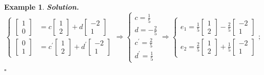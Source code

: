 \documentclass[12pt, a4paper]{article}
\newtheorem{eg}{Example}[subsection]
\newenvironment*{sol}{\par\indent\textbf{\textit{Solution. }}}{\hfill{$\square$}\par}
\def\d{{\mathrm{d}}}
\begin{document}
\begin{eg}
\begin{sol}
$$\begin{cases}\begin{bmatrix}1\\0\end{bmatrix}&=c\begin{bmatrix}1\\2\end{bmatrix}+d\begin{bmatrix}-2\\1\end{bmatrix}\\\begin{bmatrix}0\\1\end{bmatrix}&=c^{'}\begin{bmatrix}1\\2\end{bmatrix}+d^{'}\begin{bmatrix}-2\\1\end{bmatrix}\end{cases}\Longrightarrow\begin{cases}c=\frac{1}{5}\\d=-\frac{2}{5}\\c^{'}=\frac{2}{5}\\d^{'}=\frac{1}{5}\end{cases}\Longrightarrow\begin{cases} e_1=\frac{1}{5}\begin{bmatrix}1\\2\end{bmatrix}-\frac{2}{5}\begin{bmatrix}-2\\1\end{bmatrix}\\e_2=\frac{2}{5}\begin{bmatrix}1\\2\end{bmatrix}+\frac{1}{5}\begin{bmatrix}-2\\1\end{bmatrix}\end{cases};$$

\end{sol}
\end{eg}
\end{document}
